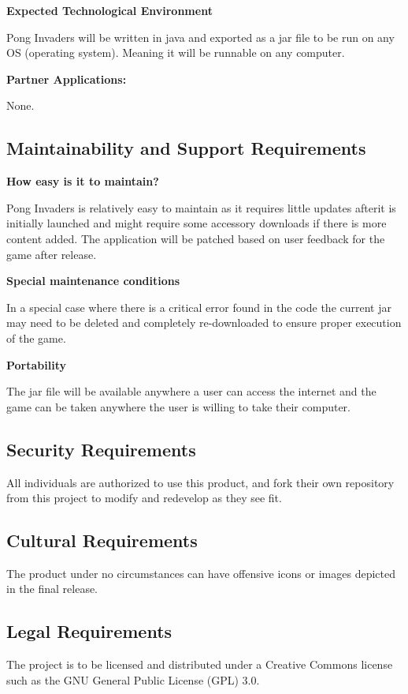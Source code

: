 \documentclass[12pt, titlepage]{article}
\begin{document}
\noindent \textbf{Expected Technological Environment}

Pong Invaders will be written in java and exported as a jar file to be run on
any OS (operating system). Meaning it will be runnable on any computer.

\noindent \textbf{Partner Applications:}

None.


\subsection{Maintainability and Support Requirements}
\textbf{How easy is it to maintain?}

Pong Invaders is relatively easy to maintain as it requires little updates
afterit is initially launched and might require some accessory downloads if
there is
more content added. The application will be patched based on user feedback for
the game after release.
 
\noindent \textbf{Special maintenance conditions}

In a special case where there is a critical error found in the code the current
jar may need to be deleted and completely re-downloaded to ensure proper
execution of the game.
 
\noindent \textbf{Portability}

The jar file will be available anywhere a user can access the internet and the
game can be taken anywhere the user is willing to take their computer.

\subsection{Security Requirements}
All individuals are authorized to use this product, and fork their own
repository from this project to modify and redevelop as they see fit.

\subsection{Cultural Requirements}
The product under no circumstances can have offensive icons or images depicted
in the final release.

\subsection{Legal Requirements}
The project is to be licensed and distributed under a Creative Commons license
such as the GNU General Public License (GPL) 3.0.
\end{document}
